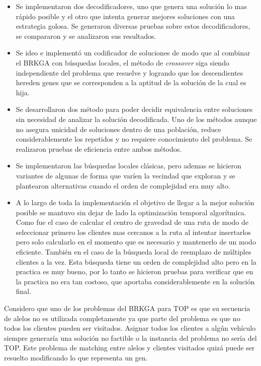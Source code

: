\begin{itemize}
	\item Se implementaron dos decodificadores, uno que genera una solución lo mas rápido posible y el otro que intenta generar mejores soluciones con una estrategia golosa. Se generaron diversas pruebas sobre estos decodificadores, se compararon y se analizaron sus resultados. 
	\item Se ideo e implementó un codificador de soluciones de modo que al combinar el BRKGA con búsquedas locales, el método de \textit{crossover} siga siendo independiente del problema que resuelve y logrando que los descendientes hereden genes que se corresponden a la aptitud de la solución de la cual es hija. 
	\item Se desarrollaron dos método para poder decidir equivalencia entre soluciones sin necesidad de analizar la solución decodificada. Uno de los métodos aunque no asegura unicidad de soluciones dentro de una población, reduce considerablemente los repetidos y no requiere conocimiento del problema. Se realizaron pruebas de eficiencia entre ambos métodos.
	\item Se implementaron las búsquedas locales clásicas, pero ademas se hicieron variantes de algunas de forma que varíen la vecindad que exploran y se plantearon alternativas cuando el orden de complejidad era muy alto.
	\item A lo largo de toda la implementación el objetivo de llegar a la mejor solución posible se mantuvo sin dejar de lado la optimización temporal algorítmica. Como fue el caso de calcular el centro de gravedad de una ruta de modo de seleccionar primero los clientes mas cercanos a la ruta al intentar insertarlos pero solo calcularlo en el momento que es necesario y mantenerlo de un modo eficiente. También en el caso de la búsqueda local de reemplazo de múltiples clientes a la vez. Esta búsqueda tiene un orden de complejidad alto pero en la practica es muy bueno, por lo tanto se hicieron pruebas para verificar que en la practica no era tan costoso, que aportaba considerablemente en la solución final.
\end{itemize}

\bigskip

Considero que uno de los problemas del BRKGA para TOP es que su secuencia de alelos no es utilizada completamente ya que parte del problema es que no todos los clientes pueden ser visitados. Asignar todos los clientes a algún vehículo siempre generaría una solución no factible o la instancia del problema no sería del TOP. Este problema de matching entre alelos y clientes visitados quizá puede ser resuelto modificando lo que representa un gen. 

